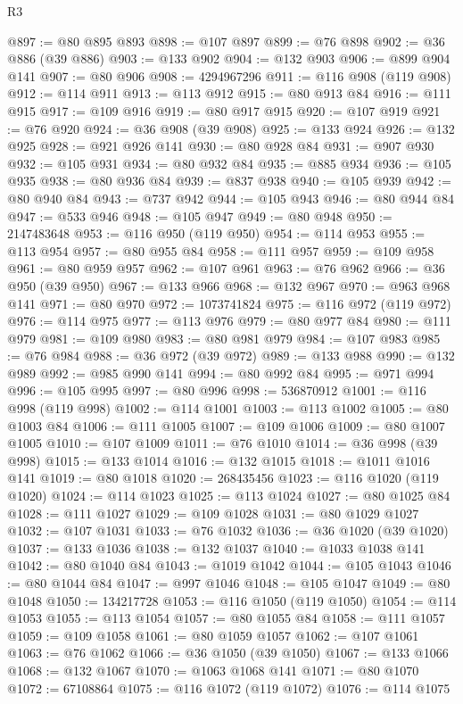 \begin{lexlean}{R3}
\begin{coremodule}
@897 := @80 @895 @893
@898 := @107 @897
@899 := @76 @898
@902 := @36 @886 (@39 @886)
@903 := @133 @902
@904 := @132 @903
@906 := @899 @904 @141
@907 := @80 @906
@908 := 4294967296
@911 := @116 @908 (@119 @908)
@912 := @114 @911
@913 := @113 @912
@915 := @80 @913 @84
@916 := @111 @915
@917 := @109 @916
@919 := @80 @917 @915
@920 := @107 @919
@921 := @76 @920
@924 := @36 @908 (@39 @908)
@925 := @133 @924
@926 := @132 @925
@928 := @921 @926 @141
@930 := @80 @928 @84
@931 := @907 @930
@932 := @105 @931
@934 := @80 @932 @84
@935 := @885 @934
@936 := @105 @935
@938 := @80 @936 @84
@939 := @837 @938
@940 := @105 @939
@942 := @80 @940 @84
@943 := @737 @942
@944 := @105 @943
@946 := @80 @944 @84
@947 := @533 @946
@948 := @105 @947
@949 := @80 @948
@950 := 2147483648
@953 := @116 @950 (@119 @950)
@954 := @114 @953
@955 := @113 @954
@957 := @80 @955 @84
@958 := @111 @957
@959 := @109 @958
@961 := @80 @959 @957
@962 := @107 @961
@963 := @76 @962
@966 := @36 @950 (@39 @950)
@967 := @133 @966
@968 := @132 @967
@970 := @963 @968 @141
@971 := @80 @970
@972 := 1073741824
@975 := @116 @972 (@119 @972)
@976 := @114 @975
@977 := @113 @976
@979 := @80 @977 @84
@980 := @111 @979
@981 := @109 @980
@983 := @80 @981 @979
@984 := @107 @983
@985 := @76 @984
@988 := @36 @972 (@39 @972)
@989 := @133 @988
@990 := @132 @989
@992 := @985 @990 @141
@994 := @80 @992 @84
@995 := @971 @994
@996 := @105 @995
@997 := @80 @996
@998 := 536870912
@1001 := @116 @998 (@119 @998)
@1002 := @114 @1001
@1003 := @113 @1002
@1005 := @80 @1003 @84
@1006 := @111 @1005
@1007 := @109 @1006
@1009 := @80 @1007 @1005
@1010 := @107 @1009
@1011 := @76 @1010
@1014 := @36 @998 (@39 @998)
@1015 := @133 @1014
@1016 := @132 @1015
@1018 := @1011 @1016 @141
@1019 := @80 @1018
@1020 := 268435456
@1023 := @116 @1020 (@119 @1020)
@1024 := @114 @1023
@1025 := @113 @1024
@1027 := @80 @1025 @84
@1028 := @111 @1027
@1029 := @109 @1028
@1031 := @80 @1029 @1027
@1032 := @107 @1031
@1033 := @76 @1032
@1036 := @36 @1020 (@39 @1020)
@1037 := @133 @1036
@1038 := @132 @1037
@1040 := @1033 @1038 @141
@1042 := @80 @1040 @84
@1043 := @1019 @1042
@1044 := @105 @1043
@1046 := @80 @1044 @84
@1047 := @997 @1046
@1048 := @105 @1047
@1049 := @80 @1048
@1050 := 134217728
@1053 := @116 @1050 (@119 @1050)
@1054 := @114 @1053
@1055 := @113 @1054
@1057 := @80 @1055 @84
@1058 := @111 @1057
@1059 := @109 @1058
@1061 := @80 @1059 @1057
@1062 := @107 @1061
@1063 := @76 @1062
@1066 := @36 @1050 (@39 @1050)
@1067 := @133 @1066
@1068 := @132 @1067
@1070 := @1063 @1068 @141
@1071 := @80 @1070
@1072 := 67108864
@1075 := @116 @1072 (@119 @1072)
@1076 := @114 @1075

\end{coremodule}
\end{lexlean}
